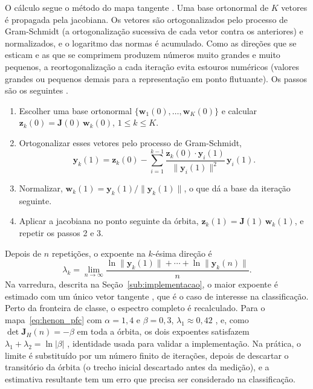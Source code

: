 \documentclass{pfccefsa}
\begin{document}
O cálculo segue o método do mapa tangente \cite{Benettin1980a,Benettin1980b,Alligood1996}.
Uma base ortonormal de $K$ vetores é propagada pela jacobiana. Os vetores são
ortogonalizados pelo processo de Gram-Schmidt (a ortogonalização sucessiva de
cada vetor contra os anteriores) \cite{Trefethen1997} e normalizados, e o logaritmo das normas é
acumulado. Como as direções que se esticam e as que se comprimem produzem
números muito grandes e muito pequenos, a reortogonalização a cada iteração
evita estouros numéricos (valores grandes ou pequenos demais para a representação
em ponto flutuante). Os passos são os seguintes \cite{Alligood1996}.
\begin{enumerate}
\item Escolher uma base ortonormal $\{\mathbf{w}_1(0),\ldots,\mathbf{w}_K(0)\}$ e
calcular $\mathbf{z}_k(0)=\mathbf{J}(0)\,\mathbf{w}_k(0)$, $1\le k\le K$.
\item Ortogonalizar esses vetores pelo processo de Gram-Schmidt,
\begin{equation}
  \mathbf{y}_k(1)=\mathbf{z}_k(0)-\sum_{i=1}^{k-1}
  \frac{\mathbf{z}_k(0)\cdot\mathbf{y}_i(1)}{\|\mathbf{y}_i(1)\|^2}\,\mathbf{y}_i(1).
  \label{eq:gs_pfc}
\end{equation}
\item Normalizar, $\mathbf{w}_k(1)=\mathbf{y}_k(1)/\|\mathbf{y}_k(1)\|$, o que dá a
base da iteração seguinte.
\item Aplicar a jacobiana no ponto seguinte da órbita,
$\mathbf{z}_k(1)=\mathbf{J}(1)\,\mathbf{w}_k(1)$, e repetir os passos 2 e 3.
\end{enumerate}
Depois de $n$ repetições, o expoente na $k$-ésima direção é
\begin{equation}
  \lambda_k=\lim_{n\to\infty}
  \frac{\ln\|\mathbf{y}_k(1)\|+\cdots+\ln\|\mathbf{y}_k(n)\|}{n}.
  \label{eq:lyap_pfc}
\end{equation}
Na varredura, descrita na Seção~\ref{sub:implementacao}, o maior expoente é
estimado com um único vetor tangente \cite{Benettin1980a,Wolf1985}, que é o caso de interesse
na classificação. Perto da fronteira de classe, o espectro completo é
recalculado. Para o mapa~\eqref{eq:henon_pfc} com $\alpha=1{,}4$ e
$\beta=0{,}3$,
$\lambda_1\approx0{,}42$ \cite{Sprott2003}, e, como $\det\mathbf{J}_H(n)=-\beta$ em
toda a órbita, os dois expoentes satisfazem $\lambda_1+\lambda_2=\ln|\beta|$
\cite{Alligood1996}, identidade usada para validar a implementação. Na prática,
o limite é substituído por um número finito de iterações, depois de descartar o
transitório da órbita (o trecho inicial descartado antes da medição), e a
estimativa resultante tem um erro que precisa ser
considerado na classificação.
\end{document}
